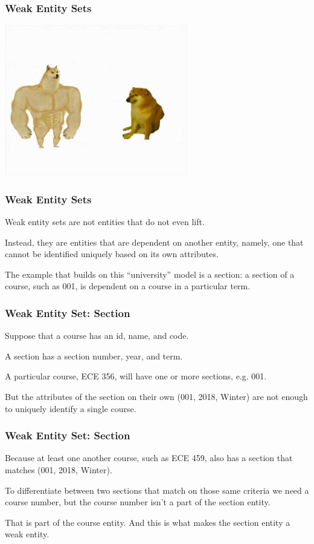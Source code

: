 \begin{frame}
\frametitle{Weak Entity Sets}

\begin{center}
	\includegraphics[width=0.6\textwidth]{images/strong-weak.jpg}
\end{center}


\end{frame}


\begin{frame}
\frametitle{Weak Entity Sets}

Weak entity sets are not entities that do not even lift. 

Instead, they are entities that are dependent on another entity, namely, one that cannot be identified uniquely based on its own attributes. 

The example that builds on this ``university'' model is a section: a section of a course, such as 001, is dependent on a course in a particular term. 

\end{frame}


\begin{frame}
\frametitle{Weak Entity Set: Section}

Suppose that a course has an id, name, and code. 

A section has a section number, year, and term. 

A particular course, ECE 356, will have one or more sections, e.g. 001. 

But the attributes of the section on their own (001, 2018, Winter) are not enough to uniquely identify a single course. 

\end{frame}

\begin{frame}
\frametitle{Weak Entity Set: Section}

Because at least one another course, such as ECE 459, also has a section that matches (001, 2018, Winter). 

To differentiate between two sections that match on those same criteria we need a course number, but the course number isn't a part of the section entity. 

That is part of the course entity. And this is what makes the section entity a weak entity.

\end{frame}




